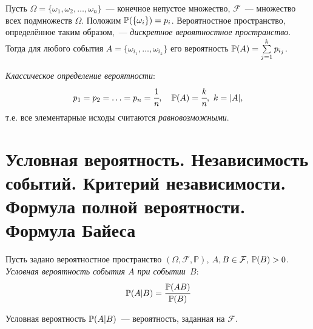 \begin{defn}
    Пусть $\Omega = \{\omega_1, \omega_2, \ldots, \omega_n\}$~--- конечное непустое множество, $\mathcal{F}$~--- множество всех подмножеств $\Omega$. Положим ${\mathbb{P}(\{\omega_i\})} = p_i$. Вероятностное пространство, определённое таким образом,~--- {\it дискретное вероятностное пространство}. Тогда для любого события $A = \{\omega_{i_1}, \ldots, \omega_{i_k}\}$ его вероятность ${\mathbb{P}(A)} = \sum\limits_{j=1}^k p_{i_j}$.
\end{defn}

\begin{defn}
    {\it Классическое определение вероятности}:
    \begin{equation*}
        p_1 = p_2 = \ldots =p_n=\cfrac{1}{n}, \quad {\mathbb{P}(A)} = \cfrac{k}{n},~ k=|A|,
    \end{equation*}
    т.е. все элементарные исходы считаются {\it равновозможными}.
\end{defn}

\section {Условная вероятность. Независимость событий. Критерий независимости. Формула полной вероятности. Формула Байеса}

\begin{defn}
    Пусть задано вероятностное пространство $(\Omega, \mathcal{F}, \mathbb{P})$, ${A, B \in \mathcal{F}, \, {\mathbb{P}(B)} > 0}$. {\it Условная вероятность события $A$ при событии~$B$}:
    \begin{equation*}
        {\mathbb{P}(A|B)}=\cfrac{{\mathbb{P}(AB)}}{{\mathbb{P}(B)}}
    \end{equation*}
\end{defn}

\begin{thm*}
    Условная вероятность ${\mathbb{P}(A|B)}$~--- вероятность, заданная на $\mathcal{F}$.
\end{thm*}

